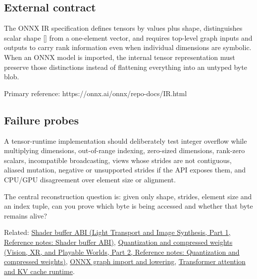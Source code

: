 \subsection{External contract}\label{appendix-cebadf3106d1-external-contract}

\hypertarget{appendix-cebadf3106d1-external-contract}{}

The ONNX IR specification defines tensors by values plus shape, distinguishes scalar shape {[}{]} from a one-element vector, and requires top-level graph inputs and outputs to carry rank information even when individual dimensions are symbolic. When an ONNX model is imported, the internal tensor representation must preserve those distinctions instead of flattening everything into an untyped byte blob.

Primary reference: https://onnx.ai/onnx/repo-docs/IR.html

\subsection{Failure probes}\label{appendix-cebadf3106d1-failure-probes}

\hypertarget{appendix-cebadf3106d1-failure-probes}{}

A tensor-runtime implementation should deliberately test integer overflow while multiplying dimensions, out-of-range indexing, zero-sized dimensions, rank-zero scalars, incompatible broadcasting, views whose strides are not contiguous, aliased mutation, negative or unsupported strides if the API exposes them, and CPU/GPU disagreement over element size or alignment.

The central reconstruction question is: given only shape, strides, element size and an index tuple, can you prove which byte is being accessed and whether that byte remains alive?

Related: \href{../04-Light-Transport-and-Image-Synthesis-P01/main.pdf\#appendix-749048795dbb}{Shader buffer ABI (Light Transport and Image Synthesis, Part 1, Reference notes: Shader buffer ABI)}, \href{../07-Vision-XR-and-Playable-Worlds-P02/main.pdf\#appendix-fdc7879e8bf2}{Quantization and compressed weights (Vision, XR, and Playable Worlds, Part 2, Reference notes: Quantization and compressed weights)}, \hyperref[appendix-a87217e3af2b]{ONNX graph import and lowering}, \hyperref[appendix-ea2dadd21ce5]{Transformer attention and KV cache runtime}.
